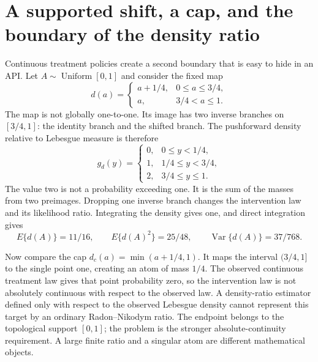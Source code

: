 \section{A supported shift, a cap, and the boundary of the density ratio}
\label{exec17:s5-pushforward}

Continuous treatment policies create a second boundary that is easy to hide in
an API. Let $A\sim\operatorname{Uniform}[0,1]$ and consider the fixed map
\begin{equation}
 d(a)=\begin{cases}a+1/4,&0\leq a\leq3/4,\\a,&3/4<a\leq1.\end{cases}
 \label{exec17:s5-shift}
\end{equation}
The map is not globally one-to-one. Its image has two inverse branches on
$[3/4,1]$: the identity branch and the shifted branch. The pushforward density
relative to Lebesgue measure is therefore
\begin{equation}
 g_d(y)=\begin{cases}
 0,&0\leq y<1/4,\\
 1,&1/4\leq y<3/4,\\
 2,&3/4\leq y\leq1.
 \end{cases}
 \label{exec17:s5-push-density}
\end{equation}
The value two is not a probability exceeding one. It is the sum of the masses
from two preimages. Dropping one inverse branch changes the intervention law
and its likelihood ratio. Integrating the density gives one, and direct
integration gives
\begin{equation}
 E\{d(A)\}=11/16,\qquad E\{d(A)^2\}=25/48,\qquad
 \operatorname{Var}\{d(A)\}=37/768.
 \label{exec17:s5-push-moments}
\end{equation}

Now compare the cap $d_c(a)=\min(a+1/4,1)$. It maps the
interval $(3/4,1]$ to the single point one, creating an atom of mass $1/4$.
The observed continuous treatment law gives that point probability zero, so
the intervention law is not absolutely continuous with respect to the observed
law. A density-ratio estimator defined only with respect to the observed
Lebesgue density cannot represent this target by an ordinary Radon--Nikodym
ratio. The endpoint belongs to the topological support $[0,1]$; the problem
is the stronger absolute-continuity requirement. A large finite ratio and a
singular atom are different mathematical objects.

